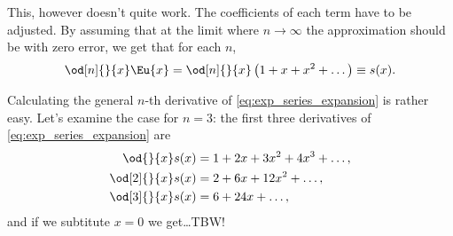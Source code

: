 This, however doesn't quite work. The coefficients of each term have to be adjusted. By assuming that at the limit where $n\to\infty$ the approximation should be with zero error, we get that for each $n$,
\begin{equation}
	\od[n]{}{x}\Eu{x} = \od[n]{}{x}\left(1+x+x^{2}+\dots\right) \equiv s(x).
	\label{eq:limit_exp}
\end{equation}

Calculating the general $n$-th derivative of \autoref{eq:exp_series_expansion} is rather easy. Let's examine the case for $n=3$: the first three derivatives of \autoref{eq:exp_series_expansion} are
\begin{align*}
	\od{}{x}s(x)    & = 1 + 2x + 3x^{2} + 4x^{3} + \dots, \\
	\od[2]{}{x}s(x) & = 2 + 6x + 12x^{2} + \dots,         \\
	\od[3]{}{x}s(x) & = 6 + 24x + \dots,
\end{align*}
and if we subtitute $x=0$ we get\dots TBW!


